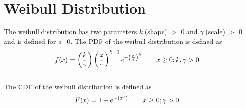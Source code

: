 	\section{Weibull Distribution}
	
		The weibull distribution has two parameters $k$ (shape) $>$ 0 and $\gamma$ (scale) $>$ 0 and is defined for \textit{x} \geq\ 0. The \ac{PDF} of the weibull distribution is defined as
		\\
		$$f(x) = \left(\frac{k}{\gamma}\right)\left(\frac{x}{\gamma}\right)^{k-1}e^{-\left(\frac{x}{\gamma}\right)^{k}} \hspace{.3in} x \geq 0; k,\gamma > 0\\$$
		\\
		The \ac{CDF} of the weibull distribution is defined as
		\\
		$$F(x) = 1 - e^{-(x^{\gamma})} \hspace{.3in} x \geq 0; \gamma > 0$$